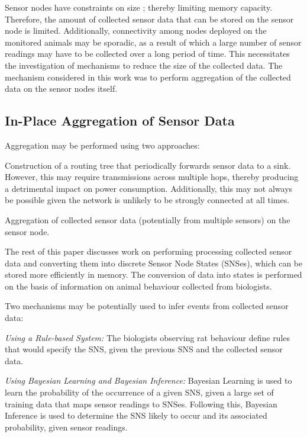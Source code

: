\documentclass{sig-alternate-10pt}
\begin{document}
Sensor nodes have constraints on size \cite{SensorSurveyAkyildiz:2002}; thereby limiting memory capacity. Therefore, the amount of collected sensor data that
can be stored on the sensor node is limited. Additionally, connectivity among
nodes deployed on the monitored animals may be sporadic, as a result of which a
large number of sensor readings may have to be collected over a long period of time. This necessitates the investigation of mechanisms to reduce the size of the collected data. The mechanism considered in this work was to perform aggregation of the collected data on the sensor nodes itself.

\subsection{In-Place Aggregation of Sensor Data} \label{subsec:InplaceAggregation}

Aggregation may be performed using two approaches:

\begin{compactitem}
  \item Construction of a routing tree that periodically forwards sensor data to a sink.
  However, this may require transmissions across multiple hops, thereby producing a
  detrimental impact on power consumption. Additionally, this may not always be possible given the network is unlikely to be strongly connected at all times.
  \item Aggregation of collected sensor data (potentially from multiple sensors) on
  the sensor node.
\end{compactitem}

The rest of this paper discusses work on performing processing collected sensor
data and converting them into discrete Sensor Node States (SNSes), which can
be stored more
efficiently in memory. The conversion of data into states  is performed on
the basis of information on animal behaviour collected from biologists.

Two mechanisms may be potentially used to infer events from collected sensor
data:

\begin{compactitem}
  \item \emph{Using a Rule-based System:} The biologists observing rat behaviour
  define rules that would specify the SNS, given the previous SNS and the collected
  sensor data. 
  \item  \emph{Using Bayesian Learning and Bayesian Inference:} Bayesian
  Learning is used to learn the probability of the occurrence of a given SNS, given
  a large set of training data that maps sensor readings to SNSes. Following this,
  Bayesian Inference is used to determine the
  SNS likely to occur and its associated probability, given sensor readings.  
\end{compactitem} 
\end{document}
